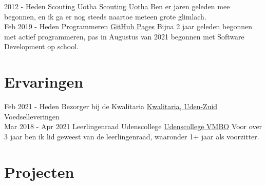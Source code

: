 \documentclass[letterpaper]{twentysecondcv} %
\begin{document}
    \begin{twenty} %
        \twentyitem
        {2012 -}
        {Heden}
        {Scouting Uotha}
        {\href{https://www.uotha.nl/}{Scouting Uotha}}
        {}
        { Ben er jaren geleden mee begonnen, en ik ga er nog steeds naartoe meteen grote glimlach.}\\
        \twentyitem
        {Feb 2019 -}
        {Heden}
        {Programmeren}
        {\href{https://tais993.github.io/}{GitHub Pages}}
        {}
        {Bijna 2 jaar geleden begonnen met actief programmeren, pas in Augustus van 2021 begonnen met Software Development op school.}
    \end{twenty}

    \vspace{6mm}




    \section{Ervaringen}
    \begin{twenty} %
        \twentyitem
        {Feb 2021 -}
        {Heden}
        {Bezorger bij de Kwalitaria}
        {\href{https://kwalitaria.nl/uden-zuid/uden-zuid/}{Kwalitaria, Uden-Zuid}}
        {}
        {Voedselleveringen}\\
        \twentyitem
        {Mar 2018 -}
        {Apr 2021}
        {Leerlingenraad Udenscollege}
        {\href{https://www.udenscollege.nl/vmbo/startpagina-vmbo/}{Udenscollege VMBO}}
        {}
        {
            Voor over 3 jaar ben ik lid geweest van de leerlingenraad, waaronder 1+ jaar als voorzitter.
        }
    \end{twenty}

    \vspace{6mm}




    \section{Projecten}
\end{document}
